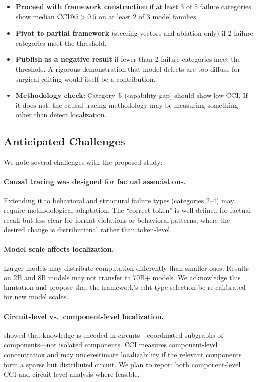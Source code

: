 \documentclass[11pt]{article}
\begin{document}
\begin{itemize}[leftmargin=*]
  \item \textbf{Proceed with framework construction} if at least 3 of 5 failure categories show median $\text{CCI}@5 > 0.5$ on at least 2 of 3 model families.
  \item \textbf{Pivot to partial framework} (steering vectors and ablation only) if 2 failure categories meet the threshold.
  \item \textbf{Publish as a negative result} if fewer than 2 failure categories meet the threshold. A rigorous demonstration that model defects are too diffuse for surgical editing would itself be a contribution.
  \item \textbf{Methodology check:} Category~5 (capability gap) should show low CCI. If it does not, the causal tracing methodology may be measuring something other than defect localization.
\end{itemize}

\subsection{Anticipated Challenges}

We note several challenges with the proposed study:

\paragraph{Causal tracing was designed for factual associations.} Extending it to behavioral and structural failure types (categories 2--4) may require methodological adaptation. The ``correct token'' is well-defined for factual recall but less clear for format violations or behavioral patterns, where the desired change is distributional rather than token-level.

\paragraph{Model scale affects localization.} Larger models may distribute computation differently than smaller ones. Results on 2B and 8B models may not transfer to 70B+ models. We acknowledge this limitation and propose that the framework's edit-type selection be re-calibrated for new model scales.

\paragraph{Circuit-level vs.\ component-level localization.} \citet{yao2024circuits} showed that knowledge is encoded in circuits---coordinated subgraphs of components---not isolated components. CCI measures component-level concentration and may underestimate localizability if the relevant components form a sparse but distributed circuit. We plan to report both component-level CCI and circuit-level analysis where feasible.
\end{document}
